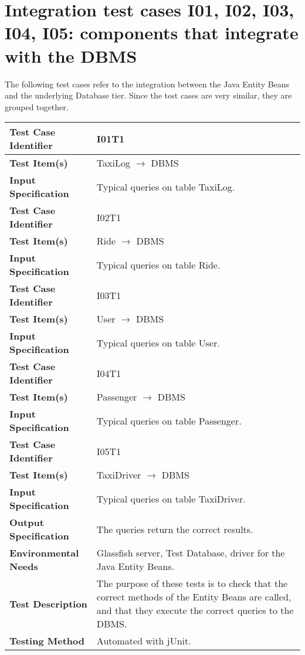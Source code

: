 \newpage

\section{Integration test cases I01, I02, I03, I04, I05: components that integrate with the DBMS}

The following test cases refer to the integration between the Java Entity Beans and the underlying Database tier.
Since the test cases are very similar, they are grouped together.

\vspace{2em}

\begin{tabular}{l p{}}
    \hline
    \textbf{Test Case Identifier} & I01T1\\
    \hline
    \textbf{Test Item(s)} & TaxiLog $\rightarrow$ DBMS \\
    \hline
    \textbf{Input Specification} & Typical queries on table TaxiLog. \\
    \hline
    \hline
    \textbf{Test Case Identifier} & I02T1\\
    \hline
    \textbf{Test Item(s)} & Ride $\rightarrow$ DBMS \\
    \hline
    \textbf{Input Specification} & Typical queries on table Ride. \\
    \hline
    \hline
    \textbf{Test Case Identifier} & I03T1\\
    \hline
    \textbf{Test Item(s)} & User $\rightarrow$ DBMS \\
    \hline
    \textbf{Input Specification} & Typical queries on table User. \\
    \hline
    \hline
    \textbf{Test Case Identifier} & I04T1\\
    \hline
    \textbf{Test Item(s)} & Passenger $\rightarrow$ DBMS \\
    \hline
    \textbf{Input Specification} & Typical queries on table Passenger. \\
    \hline
    \hline
    \textbf{Test Case Identifier} & I05T1\\
    \hline
    \textbf{Test Item(s)} & TaxiDriver $\rightarrow$ DBMS \\
    \hline
    \textbf{Input Specification} & Typical queries on table TaxiDriver. \\
    \hline
    \hline
    \textbf{Output Specification} & The queries return the correct results. \\
    \hline
    \textbf{Environmental Needs} & Glassfish server, Test Database, driver for the Java Entity Beans. \\
    \hline
    \textbf{Test Description} & The purpose of these tests is to check that the correct methods of the Entity Beans are called, and that they execute the correct queries to the DBMS.  \\
    \hline
    \textbf{Testing Method} & Automated with jUnit. \\
    \hline
\end{tabular}

